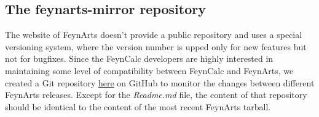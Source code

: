 \documentclass[../FeynCalcManual.tex]{subfiles}
\begin{document}
\subsection{The feynarts-mirror
repository}\label{the-feynarts-mirror-repository}

The website of FeynArts doesn't provide a public repository and uses a
special versioning system, where the version number is upped only for
new features but not for bugfixes. Since the FeynCalc developers are
highly interested in maintaining some level of compatibility between
FeynCalc and FeynArts, we created a Git repository
\href{https://github.com/FeynCalc/feynarts-mirror}{here} on GitHub to
monitor the changes between different FeynArts releases. Except for the
\emph{Readme.md} file, the content of that repository should be
identical to the content of the most recent FeynArts tarball.
\end{document}
